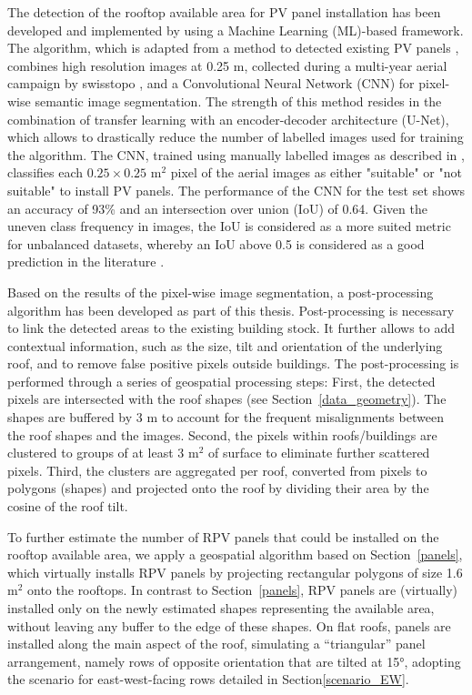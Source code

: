 The detection of the rooftop available area for PV panel installation has been developed and implemented by \citet{castello_quantification_2021} using a Machine Learning (ML)-based framework. 
The algorithm, which is adapted from a method to detected existing PV panels \cite{castello_deep_2019}, combines high resolution images at 0.25 m, collected during a multi-year aerial campaign by swisstopo \cite{swiss_federal_institue_of_topography_swisstopo_swissimage_nodate}, and a Convolutional Neural Network (CNN) for pixel-wise semantic image segmentation. The strength of this method resides in the combination of transfer learning with an encoder-decoder architecture (U-Net), which allows to drastically reduce the number of labelled images used for training the algorithm. 
The CNN, trained using manually labelled images as described in \cite{castello_quantification_2021}, classifies each $0.25 \times 0.25$ m$^2$ pixel of the aerial images as either "suitable" or "not suitable" to install PV panels. 
The performance of the CNN for the test set shows an accuracy of 93\% and an intersection over union (IoU) of 0.64. Given the uneven class frequency in images, the IoU is considered as a more suited metric for unbalanced datasets, whereby an IoU above 0.5 is considered as a good prediction in the literature \cite{castello_quantification_2021}.

Based on the results of the pixel-wise image segmentation, a post-processing algorithm has been developed as part of this thesis.
Post-processing is necessary to link the detected areas to the existing building stock. It further allows to add contextual information, such as the size, tilt and orientation of the underlying roof, and to remove false positive pixels outside buildings. The post-processing is performed through a series of geospatial processing steps: First, the detected pixels are intersected with the roof shapes (see Section~\ref{data_geometry}). The shapes are buffered by 3 m to account for the frequent misalignments between the roof shapes and the images. Second, the pixels within roofs/buildings are clustered to groups of at least 3 m$^2$ of surface to eliminate further scattered pixels. Third, the clusters are aggregated per roof, converted from pixels to polygons (shapes) and projected onto the roof by dividing their area by the cosine of the roof tilt.

To further estimate the number of RPV panels that could be installed on the rooftop available area, we apply a geospatial algorithm based on Section~\ref{panels}, which virtually installs RPV panels by projecting rectangular polygons of size 1.6 m$^2$ onto the rooftops. In contrast to Section~\ref{panels}, RPV panels are (virtually) installed only on the newly estimated shapes representing the available area, without leaving any buffer to the edge of these shapes. On flat roofs, panels are installed along the main aspect of the roof, simulating a “triangular” panel arrangement, namely rows of opposite orientation that are tilted at 15°, adopting the scenario for east-west-facing rows detailed in Section\ref{scenario_EW}.

